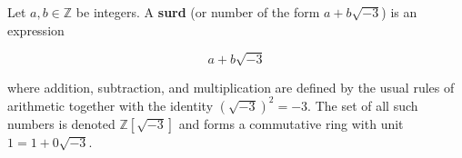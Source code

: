 Let $a, b \in \mathbb{Z}$ be integers. A \textbf{surd} (or number of the form $a + b\sqrt{-3}$) is an expression

$$
a + b\sqrt{-3}
$$

where addition, subtraction, and multiplication are defined by the usual rules of arithmetic together with the identity $(\sqrt{-3})^2 = -3$. The set of all such numbers is denoted $\mathbb{Z}[\sqrt{-3}]$ and forms a commutative ring with unit $1 = 1 + 0\sqrt{-3}$.

